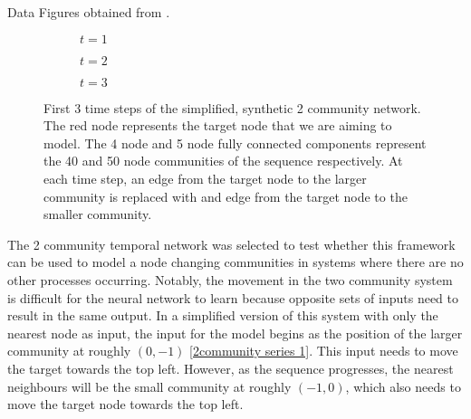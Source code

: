 \documentclass[12pt]{amsart}
\begin{document}
\begin{section}{Data}
        Figures obtained from \cite{Emma2023}.
        \begin{figure}[H]
            \centering
            \centering
            \begin{subfigure}[c]{0.3\textwidth}
                \centering
                \resizebox{.6\width}{!}{}
                \caption{$t=1$}
                \label{2community train series, a}
            \end{subfigure}
            \hfill
            \centering
            \begin{subfigure}[c]{0.3\textwidth}
                \centering
                \resizebox{.6\width}{!}{}
                \caption{$t=2$}
                \label{2community train series, b}
            \end{subfigure}
            \hfill
            \centering
            \begin{subfigure}[c]{0.3\textwidth}
                \centering
                \resizebox{.6\width}{!}{}
                \caption{$t=3$}
                \label{2community train series, c}
            \end{subfigure}
            \caption{First 3 time steps of the simplified, synthetic 2 community network. The red node represents the target node that we are aiming to model. The 4 node and 5 node fully connected components represent the 40 and 50 node communities of the sequence respectively. At each time step, an edge from the target node to the larger community is replaced with and edge from the target node to the smaller community.}
            \label{2community train series}
        \end{figure}
        The 2 community temporal network was selected to test whether this framework can be used to model a node changing communities in systems where there are no other processes occurring. Notably, the movement in the two community system is difficult for the neural network to learn because opposite sets of inputs need to result in the same output. In a simplified version of this system with only the nearest node as input, the input for the model begins as the position of the larger community at roughly $(0,-1)$ \autoref{2community series 1}. This input needs to move the target towards the top left. However, as the sequence progresses, the nearest neighbours will be the small community at roughly $(-1,0)$, which also needs to move the target node towards the top left. 


\end{section}
\end{document}
